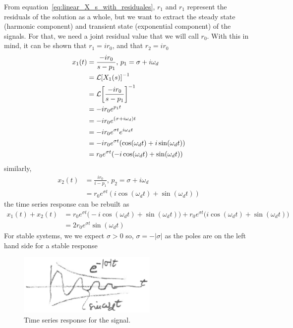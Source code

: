 \documentclass[12pt,letter]{article}
\begin{document}
From equation~\ref{eq:linear_X_s_with_residuales}, $r_1$ and $r_1$ represent the residuals of the solution as a whole, but we want to extract the steady state (harmonic component) and transient state (exponential component) of the signals. For that, we need a joint residual value that we will call $r_0$. With this in mind, it can be shown that $r_1 = i r_0$, and that $r_2 = ir_0$
\begin{align}
x_1(t) &= \frac{-i r_0}{s-p_1}\text{, } p_1 = \sigma +i \omega_d  \\
&= \mathcal{L}{\left[X_1(s)\right]}^{-1} \nonumber \\
&= \mathcal{L}{\left[\frac{-i r_0}{s-p_1}\right]}^{-1} \nonumber \\
&= -i r_0 e^{p_1 t}  \nonumber \\
&= -i r_0 e^{(\sigma + i \omega_d) t}  \nonumber \\
&= -i r_0 e^{\sigma t}  e^{i \omega_d t}  \nonumber \\
&= -i r_0 e^{\sigma t}(\cos(\omega_d t) + i \sin(\omega_d t ))  \nonumber \\
&= r_0 e^{\sigma t}(-i \cos(\omega_d t) + \sin(\omega_d t )) \nonumber
\end{align}
similarly,
\begin{align}
x_2(t) &= \frac{i r_0}{i-p_1}\text{, } p_2 = \sigma +i \omega_d \\ 
&= r_0 e^{\sigma t}(i \cos(\omega_d t) + \sin(\omega_d t )) \nonumber 
\end{align}
the time series response can be rebuilt as 
\begin{align}
x_1(t) + x_2(t) &= r_0 e^{\sigma t}\big(-i \cos(\omega_d t) + \sin(\omega_d t ) \big) + r_0 e^{\sigma t}\big(i \cos(\omega_d t) + \sin(\omega_d t ) \big) \\ 
&= 2 r_0 e^{\sigma t} \sin (\omega_d t) \nonumber 
\end{align}
For stable systems, we we expect $\sigma > 0$ so, $\sigma = -|\sigma|$ as the poles are on the left hand side for a stable response
	\begin{figure}[H]
		\centering
		\includegraphics[width=0.6\textwidth]{../figures/time_series_response_inverse_laplace.png}
		\caption{Time series response for the signal.}
	\end{figure}
\end{document}
